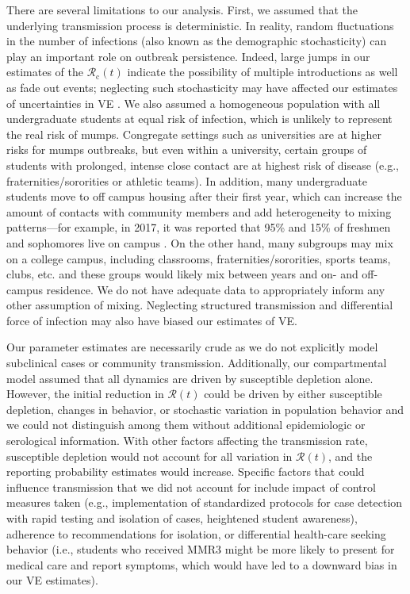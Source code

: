 \documentclass[12pt]{article}
\begin{document}
There are several limitations to our analysis. 
First, we assumed that the underlying transmission process is deterministic. 
In reality, random fluctuations in the number of infections (also known as the demographic stochasticity) can play an important role on outbreak persistence.
Indeed, large jumps in our estimates of the $\mathcal{R}_{\mathrm c}(t)$ indicate the possibility of multiple introductions as well as fade out events;
neglecting such stochasticity may have affected our estimates of uncertainties in VE \citep{king2015avoidable}.
We also assumed a homogeneous population with all undergraduate students at equal risk of infection, which is unlikely to represent the real risk of mumps. 
Congregate settings such as universities are at higher risks for mumps outbreaks, but even within a university, certain groups of students with prolonged, intense close contact are at highest risk of disease (e.g., fraternities/sororities or athletic teams). 
In addition, many undergraduate students move to off campus housing after their first year, which can increase the amount of contacts with community members and add heterogeneity to mixing patterns---for example, in 2017, it was reported that 95\% and 15\% of freshmen and sophomores live on campus \citep{news}.
On the other hand, many subgroups may mix on a college campus, including classrooms, fraternities/sororities, sports teams, clubs, etc. and these groups would likely mix between years and on- and off-campus residence. 
We do not have adequate data to appropriately inform any other assumption of mixing. 
Neglecting structured transmission and differential force of infection may also have biased our estimates of VE.

Our parameter estimates are necessarily crude as we do not explicitly model subclinical cases or community transmission.
Additionally, our compartmental model assumed that all dynamics are driven by susceptible depletion alone.
However, the initial reduction in $\mathcal R(t)$ could be driven by either susceptible depletion, changes in behavior, or stochastic variation in population behavior and we could not distinguish among them without additional epidemiologic or serological information.
With other factors affecting the transmission rate, susceptible depletion would not account for all variation in $\mathcal R(t)$, and the reporting probability estimates would increase.
Specific factors that could influence transmission that we did not account for include impact of control measures taken (e.g., implementation of standardized protocols for case detection with rapid testing and isolation of cases, heightened student awareness), adherence to recommendations for isolation, or differential health-care seeking behavior (i.e., students who received MMR3 might be more likely to present for medical care and report symptoms, which would have led to a downward bias in our VE estimates).
\end{document}
